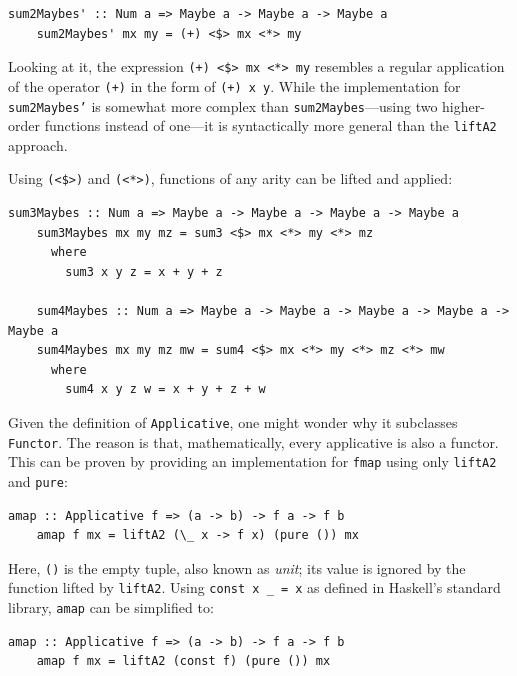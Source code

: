 \documentclass[UdineBachThesis,american,11pt]{PhdThesis}
\begin{document}
  \begin{Verbatim}[gobble=4,fontsize=\small]
    sum2Maybes' :: Num a => Maybe a -> Maybe a -> Maybe a
    sum2Maybes' mx my = (+) <$> mx <*> my
  \end{Verbatim}

  Looking at it, the expression \mbox{\texttt{(+) <\$> mx <*> my}} resembles a
  regular application of the operator \mbox{\texttt{(+)}} in the form of
  \mbox{\texttt{(+) x y}}. While the implementation for
  \mbox{\texttt{sum2Maybes'}} is somewhat more complex than
  \mbox{\texttt{sum2Maybes}}---using two higher-order functions instead of
  one---it is syntactically more general than the \mbox{\texttt{liftA2}}
  approach.

  Using \mbox{\texttt{(<\$>)}} and \mbox{\texttt{(<*>)}}, functions of any arity
  can be lifted and applied:

  \begin{Verbatim}[gobble=4,fontsize=\small]
    sum3Maybes :: Num a => Maybe a -> Maybe a -> Maybe a -> Maybe a
    sum3Maybes mx my mz = sum3 <$> mx <*> my <*> mz
      where
        sum3 x y z = x + y + z

    sum4Maybes :: Num a => Maybe a -> Maybe a -> Maybe a -> Maybe a -> Maybe a
    sum4Maybes mx my mz mw = sum4 <$> mx <*> my <*> mz <*> mw
      where
        sum4 x y z w = x + y + z + w
  \end{Verbatim}

  Given the definition of \mbox{\texttt{Applicative}}, one might wonder why it
  subclasses \mbox{\texttt{Functor}}. The reason is that, mathematically, every
  applicative is also a functor. This can be proven by providing an
  implementation for \mbox{\texttt{fmap}} using only \mbox{\texttt{liftA2}} and
  \mbox{\texttt{pure}}:

  \begin{Verbatim}[gobble=4,fontsize=\small]
    amap :: Applicative f => (a -> b) -> f a -> f b
    amap f mx = liftA2 (\_ x -> f x) (pure ()) mx
  \end{Verbatim}

  Here, \mbox{\texttt{()}} is the empty tuple, also known as \emph{unit}; its
  value is ignored by the function lifted by \mbox{\texttt{liftA2}}. Using
  \mbox{\texttt{const x \_ = x}} as defined in Haskell's standard library,
  \mbox{\texttt{amap}} can be simplified to:

  \begin{Verbatim}[gobble=4,fontsize=\small]
    amap :: Applicative f => (a -> b) -> f a -> f b
    amap f mx = liftA2 (const f) (pure ()) mx
  \end{Verbatim}
\end{document}
